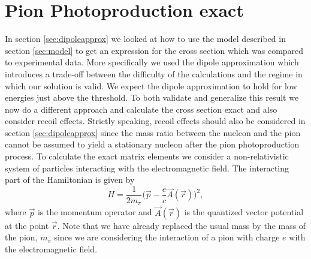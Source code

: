 \section{Pion Photoproduction exact}
In section \ref{sec:dipoleapprox} we looked at how to use the model described in section \ref{sec:model} to get an expression for the cross section which was compared to experimental data. More specifically we used the dipole approximation which introduces a trade-off between the difficulty of the calculations and the regime in which our solution is valid. We expect the dipole approximation to hold for low energies just above the threshold. To both validate and generalize this result we now do a different approach and calculate the cross section exact and also consider recoil effects. Strictly speaking, recoil effects should also be considered in section \ref{sec:dipoleapprox} since the mass ratio between the nucleon and the pion cannot be assumed to yield a stationary nucleon after the pion photoproduction process. To calculate the exact matrix elements we consider a non-relativistic system of particles interacting with the electromagnetic field. The interacting part of the Hamiltonian is given by
\begin{equation} \label{firstinthamil}
	H = \frac{1}{2m_\pi} \bigg( \vec{p}-\frac{e}{c}\vec{A}(\vec{r}) \bigg)^2,
\end{equation}
where $\vec{p}$ is the momentum operator and $\vec{A}(\vec{r})$ is the quantized vector potential at the point $\vec{r}$. Note that we have already replaced the usual mass by the mass of the pion, $m_\pi$ since we are considering the interaction of a pion with charge $e$ with the electromagnetic field. 

